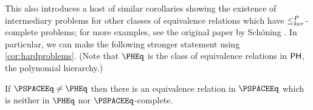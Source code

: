 
This also introduces a host of similar corollaries showing the existence of intermediary problems for other classes of equivalence relations which have $\leq^{P}_{ker}$-complete problems; for more examples, see the original paper by Schöning \autocite{schoning82}.
In particular, we can make the following stronger statement using \autoref{cor:hardproblems}.
(Note that $\PHEq$ is the class of equivalence relations in ${\mathsf{PH}}$, the polynomial hierarchy.)
\begin{corollary}\label{cor:pspace}
  If $\PSPACEEq \neq \PHEq$ then there is an equivalence relation in $\PSPACEEq$ which is neither in $\PHEq$ nor $\PSPACEEq$-complete.
\end{corollary}
